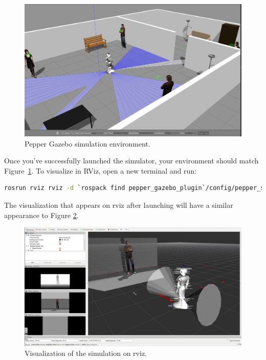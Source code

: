 \documentclass{CSSRforAfrica}
\begin{document}
{\begin{enumerate}
\begin{enumerate}[leftmargin=0pt,labelsep=0.5em]
\begin{figure}[!hbpt]
\centering
\includegraphics[scale=0.25]{./images/gazebo-screenshot.png}
\caption{Pepper Gazebo simulation environment.}
\label{fig:gazebo-sim}
\end{figure}

\noindent Once you’ve successfully launched the simulator, your environment should match Figure~\ref{fig:gazebo-sim}. To visualize in RViz, open a new terminal and run:

\begin{lstlisting}[style=withoutNumbering, language=bash]
rosrun rviz rviz -d `rospack find pepper_gazebo_plugin`/config/pepper_sensors.rviz
\end{lstlisting}
\end{enumerate}

The visualization that appears on rviz after launching will have a similar appearance to Figure \ref{fig:rviz}.

\begin{figure}[!hbpt]
\centering
\includegraphics[scale=0.40]{./images/rviz.png}
\caption{Visualization of the simulation on rviz.}
\label{fig:rviz}
\end{figure}



\end{enumerate}}
\end{document}
